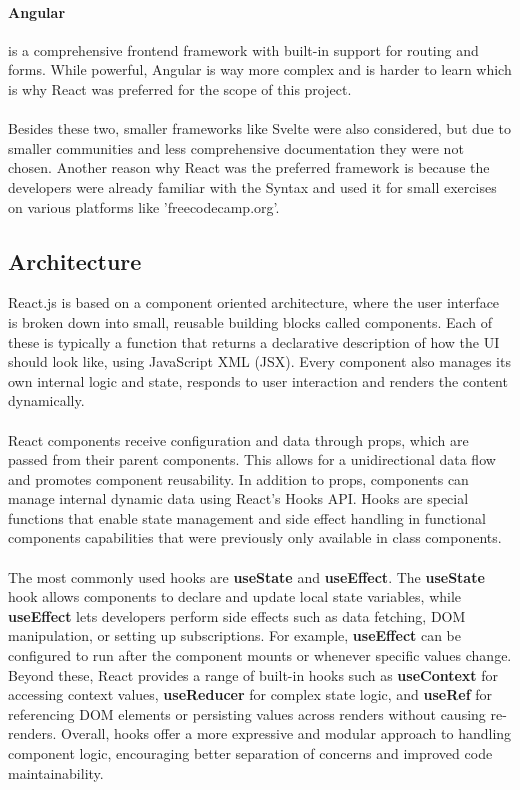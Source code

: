 \documentclass[a4paper,12pt]{report}
\begin{document}
\paragraph{Angular} is a comprehensive frontend framework with built-in support for routing and forms. While powerful, Angular is way more complex and is harder to learn which is why React was preferred for the scope of this project. \cite{angular-docs} \\ \\
Besides these two, smaller frameworks like Svelte were also considered, but due to smaller communities and less comprehensive documentation they were not chosen. Another reason why React was the preferred framework is because the developers were already familiar with the Syntax and used it for small exercises on various platforms like 'freecodecamp.org'. \\
\subsection{Architecture}
React.js is based on a component oriented architecture, where the user interface is broken down into small, reusable building blocks called components. Each of these is typically a function that returns a declarative description of how the UI should look like, using JavaScript XML (JSX). Every component also manages its own internal logic and state, responds to user interaction and renders the content dynamically. \\ \\
React components receive configuration and data through props, which are passed from their parent components. This allows for a unidirectional data flow and promotes component reusability. In addition to props, components can manage internal dynamic data using React’s Hooks API. Hooks are special functions that enable state management and side effect handling in functional components capabilities that were previously only available in class components. \cite{react-docs} \cite{mdn-react} \\ \\
The most commonly used hooks are \textbf{useState} and \textbf{useEffect}. The \textbf{useState} hook allows components to declare and update local state variables, while \textbf{useEffect} lets developers perform side effects such as data fetching, DOM manipulation, or setting up subscriptions. For example, \textbf{useEffect} can be configured to run after the component mounts or whenever specific values change. Beyond these, React provides a range of built-in hooks such as \textbf{useContext} for accessing context values, \textbf{useReducer} for complex state logic, and \textbf{useRef} for referencing DOM elements or persisting values across renders without causing re-renders. Overall, hooks offer a more expressive and modular approach to handling component logic, encouraging better separation of concerns and improved code maintainability. \cite{react-hooks}
\end{document}
